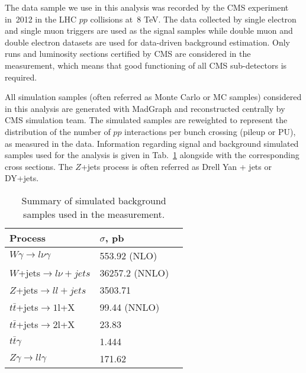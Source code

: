 The data sample we use in this analysis was recorded by the CMS experiment in~2012 in the LHC $pp$ collisions at~8 TeV. The data collected by single electron and single muon triggers are used as the signal samples while double muon and double electron datasets are used for data-driven background estimation. Only runs and luminosity sections certified by CMS are considered in the measurement, which means that good functioning of all CMS sub-detectors is required.

All simulation samples (often referred as Monte Carlo or MC samples) considered in this analysis are generated with MadGraph and reconstructed centrally by CMS simulation team. The simulated samples are reweighted to represent the distribution of the number of $pp$ interactions per bunch crossing (pileup or PU), as measured in the data. Information regarding signal and background simulated samples used for the analysis is given in Tab.~\ref{tab:mc_bkg_samples} alongside with the corresponding cross sections. The $Z$+jets process is often referred as Drell Yan + jets or DY+jets.

\begin{table}[h]
  \small
  \begin{center}
    \caption{Summary of simulated background samples used in the measurement.}
    \begin{tabular}{|l|l|l|}
      \hline
      Process                      & $\sigma$, pb         \\ \hline
      $W\gamma \rightarrow l\nu\gamma$     & 553.92 (NLO)    \\ \hline
      $W$+jets$ \rightarrow l\nu + jets$          & 36257.2 (NNLO)  \\  \hline
      $Z$+jets$ \rightarrow ll + jets$            & 3503.71         \\ \hline
      $t\bar{t}$+jets$\rightarrow 1$l+X         & 99.44 (NNLO)   \\ \hline
      $t\bar{t}$+jets$\rightarrow 2$l+X         & 23.83         \\ \hline
      $t\bar{t}\gamma$                    & 1.444          \\ \hline
      $Z\gamma \rightarrow ll\gamma$       & 171.62           \\ \hline
    \end{tabular}
    \label{tab:mc_bkg_samples}
  \end{center}
\end{table} 

